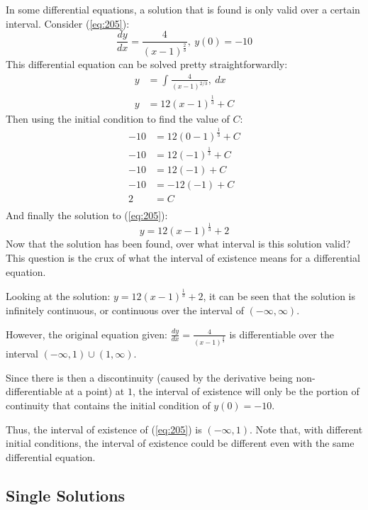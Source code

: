 \documentclass[12pt]{article}
\begin{document}
In some differential equations, a solution that is found is only valid over a certain interval. Consider (\ref{eq:205}):
\begin{equation}
  \frac{dy}{dx} = \frac{4}{(x-1)^{\frac{2}{3}}},\ y(0) = -10
  \label{eq:205}
\end{equation}
This differential equation can be solved pretty straightforwardly:
\begin{align*}
  y &= \int_{}^{} \frac{4}{(x-1)^{2/3}},\ dx \\
  y &= 12(x-1)^{\frac{1}{3}} + C
\end{align*}
Then using the initial condition to find the value of $C$:
\begin{align*}
  -10 &= 12(0-1)^{\frac{1}{3}} + C \\
  -10 &= 12(-1)^{\frac{1}{3}} + C\\
  -10 &= 12(-1) + C \\
  -10 &= -12(-1) + C \\
  2   &= C \\
\end{align*}
And finally the solution to (\ref{eq:205}):
\begin{equation*}
  y = 12(x-1)^{\frac{1}{3}} + 2
\end{equation*}
Now that the solution has been found, over what interval is this solution valid? This question is the crux of what the interval of existence means for a differential equation.

Looking at the solution: $y = 12(x-1)^{\frac{1}{3}} + 2$, it can be seen that the solution is infinitely continuous, or continuous over the interval of $(-\infty, \infty)$.

However, the original equation given: $\frac{dy}{dx} = \frac{4}{(x-1)^{\frac{2}{3}}}$ is differentiable over the interval $(-\infty,1)\cup(1,\infty)$.

Since there is then a discontinuity (caused by the derivative being non-differentiable at a point) at $1$, the interval of existence will only be the portion of continuity that contains the initial condition of $y(0)=-10$.

Thus, the interval of existence of (\ref{eq:205}) is $(-\infty, 1)$. Note that, with different initial conditions, the interval of existence could be different even with the same differential equation.

\subsection{Single Solutions}
\label{ssec:singleSolutions}
\end{document}
